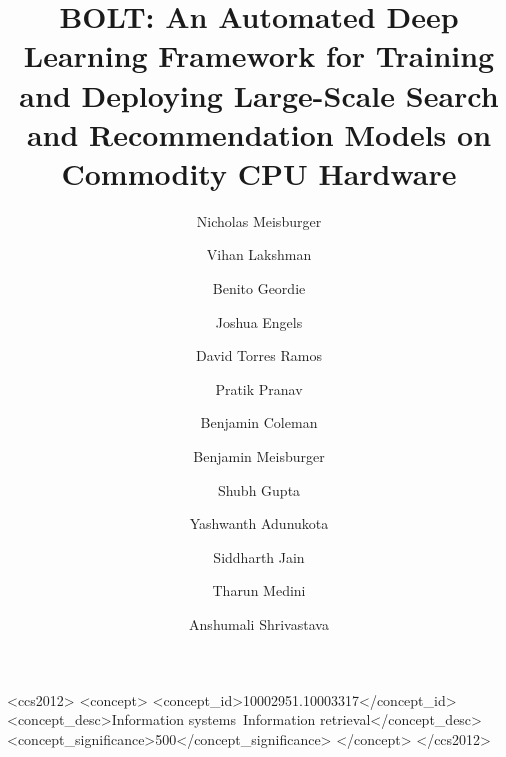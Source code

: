 \documentclass[sigconf]{acmart}
\begin{document}
\title[BOLT: An Efficient Deep Learning Framework for CPUs]{BOLT: An Automated Deep Learning Framework for Training and Deploying Large-Scale Search and Recommendation Models on Commodity CPU Hardware}





\author{Nicholas Meisburger}
\author{Vihan Lakshman}
\author{Benito Geordie}
\author{Joshua Engels}

\author{David Torres Ramos}
\author{Pratik Pranav}
\author{Benjamin Coleman}
\author{Benjamin Meisburger}

\author{Shubh Gupta}
\author{Yashwanth Adunukota}
\author{Siddharth Jain}
\author{Tharun Medini}
\author{Anshumali Shrivastava}

\begin{CCSXML}
<ccs2012>
   <concept>
       <concept_id>10002951.10003317</concept_id>
       <concept_desc>Information systems~Information retrieval</concept_desc>
       <concept_significance>500</concept_significance>
       </concept>
 </ccs2012>
\end{CCSXML}





\renewcommand{\shortauthors}{Nicholas Meisburger et al.}
\end{document}
